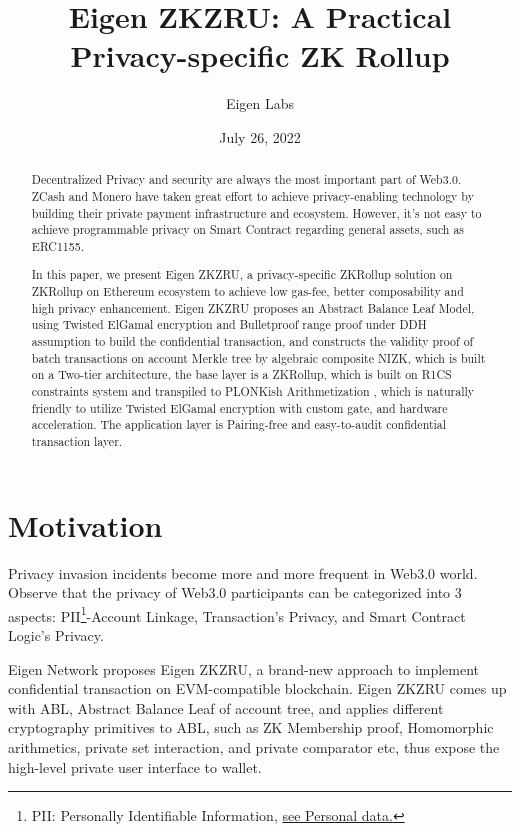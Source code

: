 \documentclass{article}
\title{Eigen ZKZRU: A Practical Privacy-specific ZK Rollup}
\author{Eigen Labs}
\date{July 26, 2022}
\begin{document}
\maketitle

\begin{abstract}
Decentralized Privacy and security are always the most important part of Web3.0. ZCash and Monero have taken great effort to achieve privacy-enabling technology by building their private payment infrastructure and ecosystem. However, it's not easy to achieve programmable privacy on Smart Contract regarding general assets, such as ERC1155.

In this paper, we present Eigen ZKZRU, a privacy-specific ZKRollup solution on ZKRollup on Ethereum ecosystem to achieve low gas-fee, better composability and high privacy enhancement. Eigen ZKZRU proposes an Abstract Balance Leaf Model, using Twisted ElGamal encryption \cite{chen2020pgc} and Bulletproof range proof \cite{bunz2018bulletproofs} under DDH assumption to build the confidential transaction, and constructs the validity proof of batch transactions on account Merkle tree by algebraic composite NIZK, which is built on a Two-tier architecture, the base layer is a ZKRollup, which is built on R1CS constraints system and transpiled to PLONKish Arithmetization \cite{gabizon2019plonk}, which is naturally friendly to utilize Twisted ElGamal encryption with custom gate, and hardware acceleration. The application layer is Pairing-free and easy-to-audit confidential transaction layer. 


\end{abstract}

\section{Motivation}

Privacy invasion incidents become more and more frequent in Web3.0 world. Observe that the privacy of Web3.0 participants can be categorized into 3 aspects: PII\footnote{PII: Personally Identifiable Information, \href{https://en.wikipedia.org/wiki/Personal_data}{see Personal data.}}-Account Linkage, Transaction's Privacy, and Smart Contract Logic's Privacy.

Eigen Network proposes Eigen ZKZRU, a brand-new approach to implement confidential transaction on EVM-compatible blockchain. Eigen ZKZRU comes up with ABL, Abstract Balance Leaf of account tree, and applies different cryptography primitives to ABL, such as ZK Membership proof, Homomorphic arithmetics, private set interaction, and private comparator etc, thus expose the high-level private user interface to wallet. 
\end{document}
